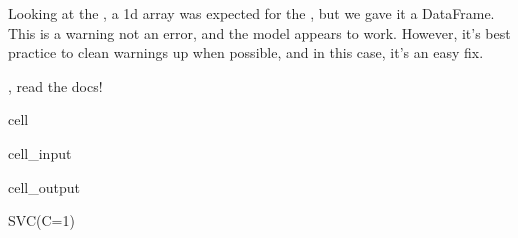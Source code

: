 \documentclass[letterpaper,10pt,english]{jupyterBook}
\begin{document}
\sphinxAtStartPar
Looking at the  , a 1d array was expected for the , but we gave it a DataFrame. This is a warning \sphinxhyphen{}not an error, and the model appears to work. However, it’s best practice to clean warnings up when possible, and in this case, it’s an easy fix.

\begin{sphinxShadowBox}
\sphinxstylesidebartitle{}

\sphinxAtStartPar
{}, read the docs!
\end{sphinxShadowBox}

\begin{sphinxuseclass}{cell}\begin{sphinxVerbatimInput}

\begin{sphinxuseclass}{cell_input}
\begin{sphinxVerbatim}[commandchars=\\\{\}]
   \PYG{p}{[}\PYG{p}{]} \PYG{p}{[}\PYG{p}{]}
\end{sphinxVerbatim}

\end{sphinxuseclass}\end{sphinxVerbatimInput}
\begin{sphinxVerbatimOutput}

\begin{sphinxuseclass}{cell_output}
\begin{sphinxVerbatim}[commandchars=\\\{\}]
SVC(C=1)
\end{sphinxVerbatim}

\end{sphinxuseclass}\end{sphinxVerbatimOutput}

\end{sphinxuseclass}
\end{document}
